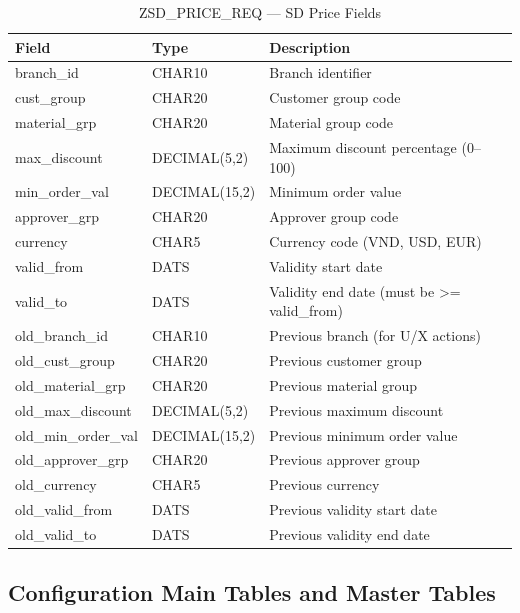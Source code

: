 \documentclass[12pt,a4paper]{report}
\begin{document}
\begin{table}[H]
\centering\small
\begin{tabularx}{\textwidth}{|l|l|X|}
  \hline
  \rowcolor{tableheadpeach}
  \textbf{Field} & \textbf{Type} & \textbf{Description} \\ \hline
  branch\_id & CHAR10 & Branch identifier \\ \hline
  cust\_group & CHAR20 & Customer group code \\ \hline
  material\_grp & CHAR20 & Material group code \\ \hline
  max\_discount & DECIMAL(5,2) & Maximum discount percentage (0--100) \\ \hline
  min\_order\_val & DECIMAL(15,2) & Minimum order value \\ \hline
  approver\_grp & CHAR20 & Approver group code \\ \hline
  currency & CHAR5 & Currency code (VND, USD, EUR) \\ \hline
  valid\_from & DATS & Validity start date \\ \hline
  valid\_to & DATS & Validity end date (must be >= valid\_from) \\ \hline
  old\_branch\_id & CHAR10 & Previous branch (for U/X actions) \\ \hline
  old\_cust\_group & CHAR20 & Previous customer group \\ \hline
  old\_material\_grp & CHAR20 & Previous material group \\ \hline
  old\_max\_discount & DECIMAL(5,2) & Previous maximum discount \\ \hline
  old\_min\_order\_val & DECIMAL(15,2) & Previous minimum order value \\ \hline
  old\_approver\_grp & CHAR20 & Previous approver group \\ \hline
  old\_currency & CHAR5 & Previous currency \\ \hline
  old\_valid\_from & DATS & Previous validity start date \\ \hline
  old\_valid\_to & DATS & Previous validity end date \\ \hline
\end{tabularx}
\caption{ZSD\_PRICE\_REQ --- SD Price Fields}
\label{tab:sd-fields}
\end{table}

\subsection{Configuration Main Tables and Master Tables}
\end{document}
